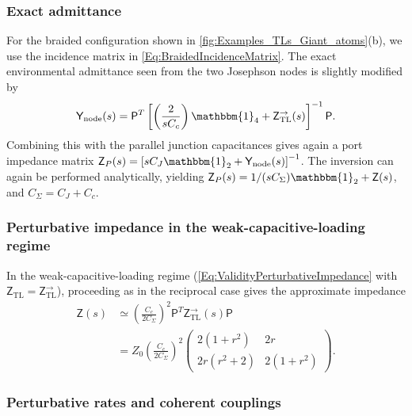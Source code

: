 \documentclass[prx,aps,twocolumn,article]{revtex4-2}
\newcommand{\msf}[1]{\mathsf{#1}}
\newcommand{\msY}{\msf{Y}}
\newcommand{\msZ}{\msf{Z}}
\newcommand{\msZTL}{\msZ_{\mathrm{TL}}}
\newcommand{\msYnode}{\msY_{\rm node}}
\newcommand{\msP}{\msf{P}}
\newcommand{\msId}{\mathbbm{1}}
\begin{document}
\subsubsection{Exact admittance}

For the braided configuration shown in
\cref{fig:Examples_TLs_Giant_atoms}(b), we use the incidence matrix in
\cref{Eq:BraidedIncidenceMatrix}. The exact environmental admittance seen
from the two Josephson nodes is slightly modified by
\begin{align}
    \msYnode(s)
    =
    \msP^T
    \left[
        \left(\frac{2}{sC_c}\right)\msId_4
        +
        \msZTL^{\rightarrow}(s)
    \right]^{-1}
    \msP.
\end{align}
Combining this with the parallel junction capacitances gives again a port impedance matrix $\msZ_P(s)  = \left[ sC_J\msId_2  + \msYnode(s)   \right]^{-1}$. The inversion can again be performed analytically, yielding $\msZ_P(s) =  1/(sC_\Sigma) \msId_2 + \msZ(s)$, and $C_\Sigma=C_J+C_c$.


\subsubsection{Perturbative impedance in the weak-capacitive-loading regime}
\label{sec:weakZ}
In the weak-capacitive-loading regime (\cref{Eq:ValidityPerturbativeImpedance}
with $\msZTL=\msZTL^{\rightarrow}$), proceeding as in the reciprocal case gives the approximate impedance
\begin{align}
    \msZ(s)
    &\simeq
    \left(
        \frac{C_c}{2C_\Sigma}
    \right)^2
    \msP^T
    \msZTL^{\rightarrow}(s)
    \msP
    \\
    &=
    Z_0
    \left(
        \frac{C_c}{2C_\Sigma}
    \right)^2
    \begin{pmatrix}
        2(1+r^2)
        &
        2r
        \\
        2r(r^2+2)
        &
        2(1+r^2)
    \end{pmatrix}.
    \label{eq:Zweak_general}
\end{align}

\subsubsection{Perturbative rates and coherent couplings}
\end{document}
